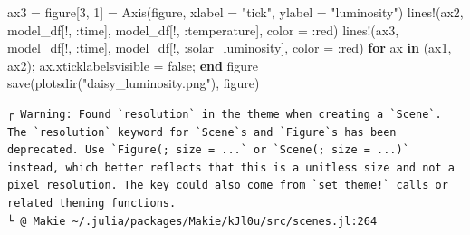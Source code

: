 \documentclass[
  english,
  russian,
  12pt,
  a4paper,
  DIV=11,
  numbers=noendperiod]{scrreprt}
\newenvironment{Shaded}{\begin{snugshade}}{\end{snugshade}}
\newcommand{\ConstantTok}[1]{\textcolor[rgb]{0.56,0.35,0.01}{#1}}
\newcommand{\ControlFlowTok}[1]{\textcolor[rgb]{0.00,0.23,0.31}{\textbf{#1}}}
\newcommand{\FloatTok}[1]{\textcolor[rgb]{0.68,0.00,0.00}{#1}}
\newcommand{\FunctionTok}[1]{\textcolor[rgb]{0.28,0.35,0.67}{#1}}
\newcommand{\KeywordTok}[1]{\textcolor[rgb]{0.00,0.23,0.31}{\textbf{#1}}}
\newcommand{\NormalTok}[1]{\textcolor[rgb]{0.00,0.23,0.31}{#1}}
\newcommand{\OperatorTok}[1]{\textcolor[rgb]{0.37,0.37,0.37}{#1}}
\newcommand{\StringTok}[1]{\textcolor[rgb]{0.13,0.47,0.30}{#1}}
\begin{document}
\begin{Shaded}
\begin{Highlighting}[]
\NormalTok{ax3 }\OperatorTok{=}\NormalTok{ figure[}\FloatTok{3}\NormalTok{, }\FloatTok{1}\NormalTok{] }\OperatorTok{=} \FunctionTok{Axis}\NormalTok{(figure, xlabel }\OperatorTok{=} \StringTok{"tick"}\NormalTok{, ylabel }\OperatorTok{=} \StringTok{"luminosity"}\NormalTok{)}
\FunctionTok{lines!}\NormalTok{(ax2, model\_df[!, }\OperatorTok{:}\NormalTok{time], model\_df[!, }\OperatorTok{:}\NormalTok{temperature], color }\OperatorTok{=} \OperatorTok{:}\NormalTok{red)}
\FunctionTok{lines!}\NormalTok{(ax3, model\_df[!, }\OperatorTok{:}\NormalTok{time], model\_df[!, }\OperatorTok{:}\NormalTok{solar\_luminosity], color }\OperatorTok{=} \OperatorTok{:}\NormalTok{red)}
\ControlFlowTok{for}\NormalTok{ ax }\KeywordTok{in}\NormalTok{ (ax1, ax2); ax.xticklabelsvisible }\OperatorTok{=} \ConstantTok{false}\NormalTok{; }\ControlFlowTok{end}
\NormalTok{figure}
\FunctionTok{save}\NormalTok{(}\FunctionTok{plotsdir}\NormalTok{(}\StringTok{"daisy\_luminosity.png"}\NormalTok{), figure)}
\end{Highlighting}
\end{Shaded}

\begin{verbatim}
┌ Warning: Found `resolution` in the theme when creating a `Scene`. The `resolution` keyword for `Scene`s and `Figure`s has been deprecated. Use `Figure(; size = ...` or `Scene(; size = ...)` instead, which better reflects that this is a unitless size and not a pixel resolution. The key could also come from `set_theme!` calls or related theming functions.
└ @ Makie ~/.julia/packages/Makie/kJl0u/src/scenes.jl:264
\end{verbatim}
\end{document}
